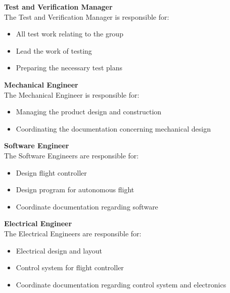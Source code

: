 \newpage
\noindent\textbf{Test and Verification Manager}\\
The Test and Verification Manager is responsible for:
\begin{itemize}
  \item All test work relating to the group 
  \item Lead the work of testing
  \item Preparing the necessary test plans
\end{itemize}
\bigskip
\textbf{Mechanical Engineer}\\
The Mechanical Engineer is responsible for:
\begin{itemize}
  \item Managing the product design and construction
  \item Coordinating the documentation concerning mechanical design
\end{itemize}
\bigskip
\textbf{Software Engineer}\\
The Software Engineers are responsible for: 
\begin{itemize}
  \item Design flight controller
  \item Design program for autonomous flight 
  \item Coordinate documentation regarding software
\end{itemize}
\bigskip
\textbf{Electrical Engineer}\\
The Electrical Engineers are responsible for:
\begin{itemize}
  \item Electrical design and layout
  \item Control system for flight controller
  \item Coordinate documentation regarding control system and electronics
\end{itemize}

